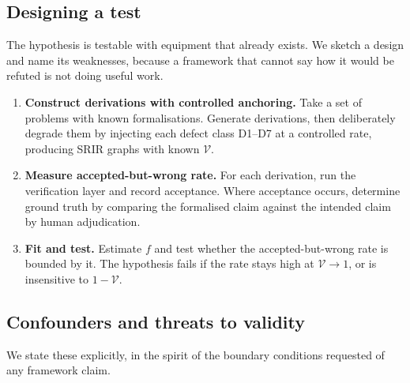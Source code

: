 \documentclass[11pt,a4paper]{article}
\theoremstyle{definition}
\theoremstyle{plain}
\theoremstyle{remark}
\newcommand{\V}{\mathcal{V}}           %
\begin{document}
\subsection{Designing a test}

The hypothesis is testable with equipment that already exists. We sketch a
design and name its weaknesses, because a framework that cannot say how it would
be refuted is not doing useful work.

\begin{enumerate}
  \item \textbf{Construct derivations with controlled anchoring.} Take a set of
        problems with known formalisations. Generate derivations, then
        deliberately degrade them by injecting each defect class D1--D7 at a
        controlled rate, producing SRIR graphs with known $\V$.
  \item \textbf{Measure accepted-but-wrong rate.} For each derivation, run the
        verification layer and record acceptance. Where acceptance occurs,
        determine ground truth by comparing the formalised claim against the
        intended claim by human adjudication.
  \item \textbf{Fit and test.} Estimate $f$ and test whether the accepted-but-wrong
        rate is bounded by it. The hypothesis fails if the rate stays high at
        $\V \to 1$, or is insensitive to $1 - \V$.
\end{enumerate}

\subsection{Confounders and threats to validity}

We state these explicitly, in the spirit of the boundary conditions requested of
any framework claim.
\end{document}
